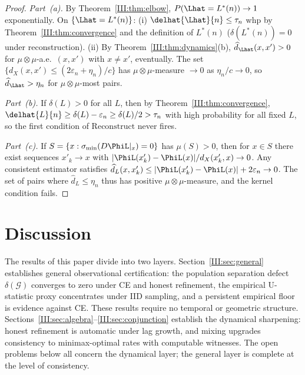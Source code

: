 \begin{proof}
\emph{Part~(a).}
By Theorem~\ref{III:thm:elbow}, $P(\Lhat = L^*(n)) \to 1$ exponentially.
On $\{\Lhat = L^*(n)\}$:
(i) $\delhat{\Lhat}{n} \leq \tau_n$ whp by Theorem~\ref{III:thm:convergence}
and the definition of $L^*(n)$ ($\delta(L^*(n)) = 0$ under reconstruction).
(ii) By Theorem~\ref{III:thm:dynamics}(b), $\widehat{d}_{\Lhat}(x,x') > 0$
for $\mu \otimes \mu$-a.e.\ $(x,x')$ with $x \neq x'$, eventually.
The set $\{d_X(x,x') \leq (2\varepsilon_n + \eta_n)/c\}$ has
$\mu \otimes \mu$-measure $\to 0$ as $\eta_n/c \to 0$, so
$\widehat{d}_{\Lhat} > \eta_n$ for $\mu\otimes\mu$-most pairs.

\emph{Part~(b).}
If $\delta(L) > 0$ for all $L$, then by Theorem~\ref{III:thm:convergence},
$\delhat{L}{n} \geq \delta(L) - \varepsilon_n \geq \delta(L)/2 > \tau_n$
with high probability for all fixed $L$, so the first condition of
$\mathrm{Reconstruct}$ never fires.

\emph{Part~(c).}
If $S = \{x : \sigma_{\min}(D\PhiL|_x) = 0\}$ has $\mu(S) > 0$,
then for $x \in S$ there exist sequences $x'_k \to x$ with
$|\PhiL(x'_k) - \PhiL(x)| / d_X(x'_k, x) \to 0$.
Any consistent estimator satisfies
$\widehat{d}_L(x, x'_k) \leq |\PhiL(x'_k) - \PhiL(x)| + 2\varepsilon_n \to 0$.
The set of pairs where $\widehat{d}_L \leq \eta_n$ thus has positive
$\mu \otimes \mu$-measure, and the kernel condition fails.
\end{proof}

\section{Discussion}
\label{III:sec:discussion}

The results of this paper divide into two layers.  Section~\ref{III:sec:general}
establishes general observational certification: the population separation defect
$\delta(\mathcal{G})$ converges to zero under CE and honest refinement, the
empirical U-statistic proxy concentrates under IID sampling, and a persistent
empirical floor is evidence against CE.  These results require no temporal or
geometric structure.  Sections~\ref{III:sec:algebra}--\ref{III:sec:conjunction}
establish the dynamical sharpening: honest refinement is automatic under lag
growth, and mixing upgrades consistency to minimax-optimal rates with computable
witnesses.  The open problems below all concern the dynamical layer; the general
layer is complete at the level of consistency.


